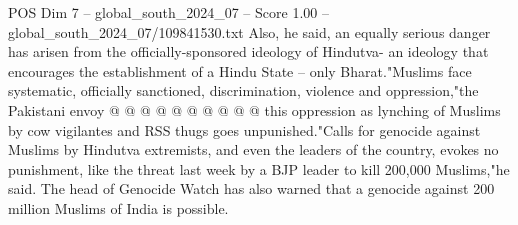 \begin{textsample}{POS Dim 7 – global\_south\_2024\_07 – Score 1.00 – global\_south\_2024\_07/109841530.txt}
Also, he said, an equally serious danger has arisen from the officially-sponsored ideology of Hindutva- an ideology that encourages the establishment of a Hindu State -- only Bharat."Muslims face systematic, officially sanctioned, discrimination, violence and oppression,"the Pakistani envoy @ @ @ @ @ @ @ @ @ @ this oppression as lynching of Muslims by cow vigilantes and RSS thugs goes unpunished."Calls for genocide against Muslims by Hindutva extremists, and even the leaders of the country, evokes no punishment, like the threat last week by a BJP leader to kill 200,000 Muslims,"he said.
The head of Genocide Watch has also warned that a genocide against 200 million Muslims of India is possible.

\end{textsample}

